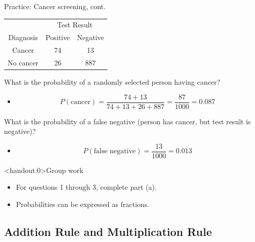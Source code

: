 \documentclass[xcolor=table, handout]{beamer}
\begin{document}
\begin{frame}{Practice: Cancer screening, cont.}
\begin{block}{}
{\centering
\begin{tabular}{c | c  c }
\multicolumn{1}{c}{} & \multicolumn{2}{c}{Test Result}\\
Diagnosis & Positive & Negative \\
\hline
Cancer & 74 & 13 \\
No cancer & 26 & 887\\
\end{tabular}\par
}
\end{block}

\begin{exampleblock}{}
What is the probability of a randomly selected person having cancer?
\begin{itemize}
\pause
\item \[P(\text{cancer}) = \frac {74 + 13}{74+13+26+887} = \frac {87}{1000} = 0.087\]
\end{itemize}

\pause
What is the probability of a false negative (person has cancer, but test result is negative)?
\begin{itemize}
\pause
\item \[ P(\text{false negative}) = \frac {13}{1000} = 0.013\]
\end{itemize}
\end{exampleblock}
\end{frame}

\begin{frame}<handout:0>{Group work}
\begin{block}{}
\large
\begin{itemize}
\item For questions 1 through 3, complete part (a).
\item Probabilities can be expressed as fractions.
\end{itemize}
\end{block}
\end{frame}

\subsection{Addition Rule and Multiplication Rule}
\end{document}
